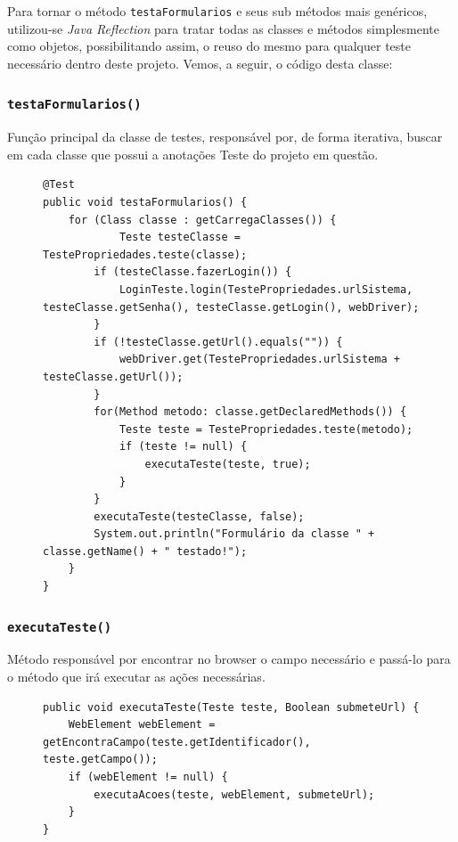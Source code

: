 \documentclass[tg]{mdtufsm}
\begin{document}
	Para tornar o método \texttt{testaFormularios} e seus sub métodos mais genéricos, utilizou-se \emph{Java Reflection} para tratar todas as classes e métodos simplesmente como objetos, possibilitando assim, o reuso do mesmo para qualquer teste necessário dentro deste projeto. Vemos, a seguir, o código desta classe:
	
\subsubsection{\texttt{testaFormularios()}}
Função principal da classe de testes, responsável por, de forma iterativa, buscar em cada classe que possui a anotações Teste do projeto em questão.

\begin{figure}[!htb]
\begin{lstlisting}
@Test
public void testaFormularios() {
	for (Class classe : getCarregaClasses()) {
    		Teste testeClasse = TestePropriedades.teste(classe);
        if (testeClasse.fazerLogin()) {
            LoginTeste.login(TestePropriedades.urlSistema, testeClasse.getSenha(), testeClasse.getLogin(), webDriver);
        }
        if (!testeClasse.getUrl().equals("")) {
            webDriver.get(TestePropriedades.urlSistema + testeClasse.getUrl());
        }
        for(Method metodo: classe.getDeclaredMethods()) {
            Teste teste = TestePropriedades.teste(metodo);
            if (teste != null) {    
                executaTeste(teste, true);
            }
        }
        executaTeste(testeClasse, false);
        System.out.println("Formulário da classe " + classe.getName() + " testado!");
	}     
}	
\end{lstlisting}
	\label{code:testaFormularios}
\end{figure}

\subsubsection{\texttt{executaTeste()}}
Método responsável por encontrar no browser o campo necessário e passá-lo para o método que irá executar as ações necessárias.

\begin{figure}[!htb]
\begin{lstlisting}
public void executaTeste(Teste teste, Boolean submeteUrl) {
    WebElement webElement = getEncontraCampo(teste.getIdentificador(), teste.getCampo());
    if (webElement != null) {
        executaAcoes(teste, webElement, submeteUrl);
    }
}
\end{lstlisting}
	\label{code:executaTeste}
\end{figure}
\end{document}
